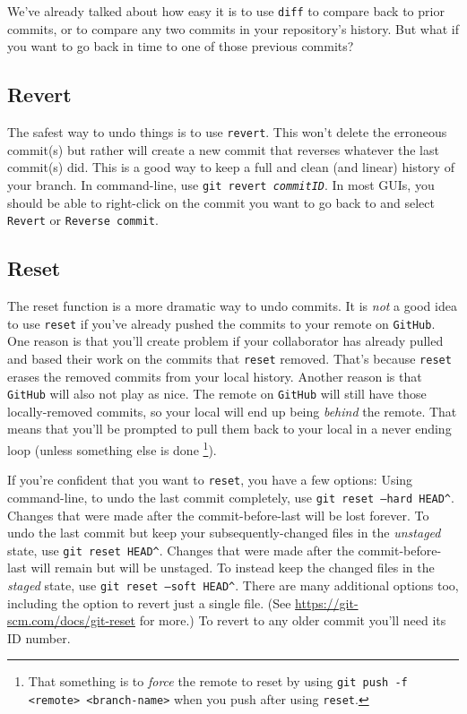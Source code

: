 \documentclass[12pt,letterpaper]{article}
\begin{document}
We've already talked about how easy it is to use \texttt{diff} to compare back to 
prior commits, or to compare any two commits in your repository's history.
But what if you want to go back in time to one of those previous commits?

\subsection{Revert}
The safest way to undo things is to use \texttt{revert}.  
This won't delete the erroneous commit(s) but rather 
will create a new commit that reverses whatever the last commit(s) did.
This is a good way to keep a full and clean (and linear) history of your branch.
In command-line, use \texttt{git revert \textit{commitID}}.
In most GUIs, you should be able to right-click on the commit you want to go 
back to and select \texttt{Revert} or \texttt{Reverse commit}.

\subsection{Reset}
The reset function is a more dramatic way to undo commits.
It is \textit{not} a good idea to use \texttt{reset} if you've already pushed the 
commits to your remote on \texttt{GitHub}. 
One reason is that you'll create problem if your collaborator has already pulled 
and based their work on the commits that \texttt{reset} removed.
That's because \texttt{reset} erases the removed commits from your local 
history.
Another reason is that \texttt{GitHub} will also not play as nice.
The remote on \texttt{GitHub} will still have those locally-removed commits,
so your local will end up being \textit{behind} the remote.
That means that you'll be prompted to pull them back to your local in a never 
ending loop (unless something else is done
\unskip
\footnote{That something is to \textit{force} the remote to reset by using
	\texttt{git push -f <remote> <branch-name>} when you push after using 
	\texttt{reset}.}).

If you're confident that you want to \texttt{reset}, you have a few options:
Using command-line, to undo the last commit completely, 
use \texttt{git reset --hard HEAD\^}.
Changes that were made after the commit-before-last will be lost forever.
To undo the last commit but keep your subsequently-changed files in the \emph{unstaged} state, use \texttt{git reset HEAD\^}.
Changes that were made after the commit-before-last will remain but will be 
unstaged. 
To instead keep the changed files in the \emph{staged} state, 
use \texttt{git reset --soft HEAD\^}.
There are many additional options too, including the option to revert just a single file.
(See \url{https://git-scm.com/docs/git-reset} for more.)
To revert to any older commit you'll need its ID number.
\end{document}
